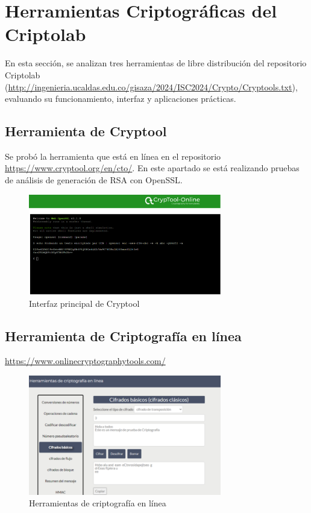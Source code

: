 \section{Herramientas Criptográficas del Criptolab}

En esta sección, se analizan tres herramientas de libre distribución del repositorio Criptolab (\url{http://ingenieria.ucaldas.edu.co/gisaza/2024/ISC2024/Crypto/Cryptools.txt}), evaluando su funcionamiento, interfaz y aplicaciones prácticas.

\subsection{Herramienta de Cryptool}

Se probó la herramienta que está en línea en el repositorio \url{https://www.cryptool.org/en/cto/}. 
En este apartado se está realizando pruebas de análisis de generación de RSA con OpenSSL.

\begin{figure}[H]  %
	\centering
	\includegraphics[width=0.75\textwidth]{./assets/img1.png}
	\caption{Interfaz principal de Cryptool}
	\label{fig:cryptool-interface}
\end{figure}

\FloatBarrier  %

\subsection{Herramienta de Criptografía en línea}

\url{https://www.onlinecryptographytools.com/}

\begin{figure}[H]
	\centering
	\includegraphics[width=0.75\textwidth]{./assets/img2.png}
	\caption{Herramientas de criptografía en línea}
	\label{fig:online-crypto-tools}
\end{figure}

